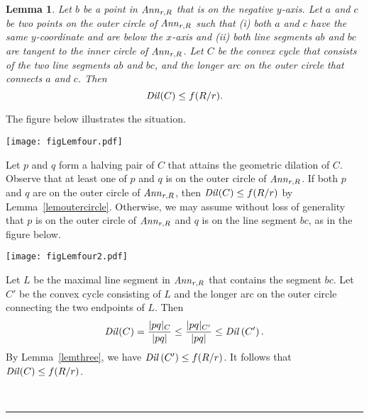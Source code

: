 \documentclass[12pt]{article}
\newtheorem{lemma}{Lemma}
\newcommand{\Ann}{\mathord{\it Ann}}
\newcommand{\Dil}{\mathord{\it Dil}}
\newcommand{\qed}{\rule{0.5em}{1.5ex}}
\newcommand{\fqed}{{\hfill~\qed}}
\newenvironment{proof}{{\noindent \bf Proof.}}
                      {{\hfill \fqed} \vspace{1em}}
\begin{document}
\begin{lemma}   \label{lemfour}  
Let $b$ be a point in $\Ann_{r,R}$ that is on the negative $y$-axis. 
Let $a$ and $c$ be two points on the outer circle of $\Ann_{r,R}$ 
such that (i) both $a$ and $c$ have the same $y$-coordinate and are
below the $x$-axis and (ii) both line segments $ab$ and $bc$ are 
tangent to the inner circle of $\Ann_{r,R}$. 
Let $C$ be the convex cycle that consists of the two line segments $ab$
and $bc$, and the longer arc on the outer circle that connects $a$ 
and $c$. Then 
\[ \Dil(C) \leq f(R/r) .
\]  
\end{lemma} 
\begin{proof}  
The figure below illustrates the situation. 

\begin{center}
   \texttt{[image: figLemfour.pdf]}
\end{center}

Let $p$ and $q$ form a halving pair of $C$ that attains the geometric 
dilation of $C$. Observe that at least one of $p$ and $q$ is on the 
outer circle of $\Ann_{r,R}$. If both $p$ and $q$ are on the outer 
circle of $\Ann_{r,R}$, then $\Dil(C) \leq f(R/r)$ by 
Lemma~\ref{lemoutercircle}. Otherwise, we may assume without loss of 
generality that $p$ is on the outer circle of $\Ann_{r,R}$ and $q$ is 
on the line segment $bc$, as in the figure below. 

\begin{center}
   \texttt{[image: figLemfour2.pdf]}
\end{center}

Let $L$ be the maximal line segment in $\Ann_{r,R}$ that contains the 
segment $bc$. Let $C'$ be the convex cycle consisting of $L$ and the 
longer arc on the outer circle connecting the two endpoints of $L$. Then 
\[ \Dil(C) = \frac{|pq|_C}{|pq|} \leq \frac{|pq|_{C'}}{|pq|} \leq  
   \Dil \left( C' \right) . 
\] 
By Lemma~\ref{lemthree}, we have $\Dil \left( C' \right) \leq f(R/r)$. 
It follows that $\Dil(C) \leq f(R/r)$. 
\end{proof}  
\end{document}
